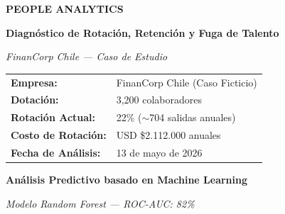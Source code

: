 \documentclass[11pt,a4paper,twoside]{article}
\begin{document}
\thispagestyle{empty}
\begin{center}
    \vspace*{2cm}
    
    {\fontsize{28}{34}\selectfont\color{darkblue}\textbf{PEOPLE ANALYTICS}}
    
    \vspace{0.5cm}
    
    {\fontsize{18}{22}\selectfont\color{lightblue}\textbf{Diagnóstico de Rotación, Retención y Fuga de Talento}}
    
    \vspace{0.5cm}
    
    {\fontsize{14}{17}\selectfont\color{accent}\textit{FinanCorp Chile — Caso de Estudio}}
    
    \vspace{3cm}
    
    
    \vspace{3cm}
    
    \begin{tabular}{ll}
        \textbf{Empresa:} & FinanCorp Chile (Caso Ficticio) \\
        \textbf{Dotación:} & 3,200 colaboradores \\
        \textbf{Rotación Actual:} & 22\% (\(\sim\)704 salidas anuales) \\
        \textbf{Costo de Rotación:} & USD \$2.112.000 anuales \\
        \textbf{Fecha de Análisis:} & 13 de mayo de 2026
    \end{tabular}
    
    \vfill
    
    {\large\textbf{Análisis Predictivo basado en Machine Learning}}
    
    {\small\textit{Modelo Random Forest — ROC-AUC: 82\%}}
    
    \vspace{2cm}
\end{center}

\newpage

\end{document}
